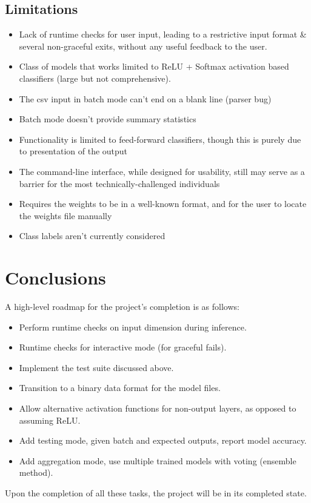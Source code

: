 \documentclass[12pt, titlepage]{article}
\begin{document}
\subsection{Limitations}
\begin{itemize}
	\item Lack of runtime checks for user input, leading to a restrictive input format \& several non-graceful exits, without any useful feedback to the user.
	\item Class of models that works limited to ReLU + Softmax activation based classifiers (large but not comprehensive).
	\item The csv input in batch mode can't end on a blank line (parser bug)
	\item Batch mode doesn't provide summary statistics
	
	\item Functionality is limited to feed-forward classifiers, though this is purely due to presentation of the output
	\item The command-line interface, while designed for usability, still may serve as a barrier for the most technically-challenged individuals
	\item Requires the weights to be in a well-known format, and for the user to locate the weights file manually
	\item Class labels aren't currently considered
\end{itemize}

\section{Conclusions}
A high-level roadmap for the project's completion is as follows:
\begin{itemize}
	\item Perform runtime checks on input dimension during inference.
	\item Runtime checks for interactive mode (for graceful fails).
	\item Implement the test suite discussed above.
	\item Transition to a binary data format for the model files.
	\item Allow alternative activation functions for non-output layers, as opposed to assuming ReLU.
	\item Add testing mode, given batch and expected outputs, report model accuracy.
	\item Add aggregation mode, use multiple trained models with voting (ensemble method).
\end{itemize}
Upon the completion of all these tasks, the project will be in its completed state.\bigskip
\end{document}
